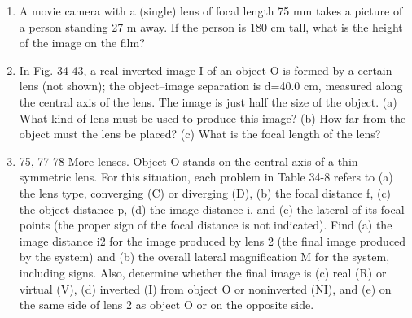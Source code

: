 \documentclass[fleqn]{article}
\begin{document}
\begin{enumerate}
    \item A movie camera with a (single) lens of focal length 75 mm takes a picture of a person standing 27 m away. If the person is 180 cm tall, what is the height of the image on the film?

    \item In Fig. 34-43, a real inverted image I of an object O is formed by a certain lens (not shown); the object–image separation is d=40.0 cm, measured along the central axis of the lens. The image is just half the size of the object. (a) What kind of lens must be used to produce this image? (b) How far from the object must the lens be placed? (c) What is the focal length of the lens?
    
    \item 75, 77 78 More lenses. Object O stands on the central axis of a thin symmetric lens. For this situation, each problem in Table 34-8 refers to (a) the lens type, converging (C) or diverging (D), (b) the focal distance f, (c) the object distance p, (d) the image distance i, and (e) the lateral of its focal points (the proper sign of the focal distance is not indicated). Find (a) the image distance i2 for the image produced by lens 2 (the final image produced by the system) and (b) the overall lateral magnification M for the system, including signs. Also, determine whether the final image is (c) real (R) or virtual (V), (d) inverted (I) from object O or noninverted (NI), and (e) on the same side of lens 2 as object O or on the opposite side.
    
  \end{enumerate}
\end{document}
